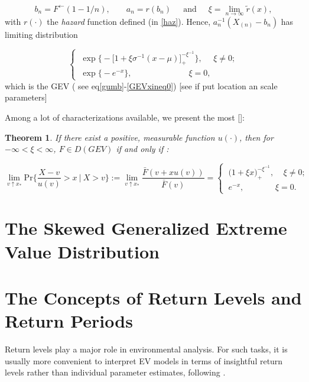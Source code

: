 \documentclass[11pt,a4paper,openany ]{book}
\newtheorem{theorem}{Theorem}[chapter]
\begin{document}
\begin{equation*}
b_n=F^{\leftarrow}(1-1/n)\text{, } \ \ \ \ \ \ \ \ a_n=r(b_n) \ \ \ \ \ \text{ and } \ \ \ \ \ \xi=\displaystyle{\lim_{n \to \infty}}\tilde{r}(x),
\end{equation*}
with $r(\cdot)$ the \emph{hazard} function defined (in \ref{haz}). Hence, $a_n^{-1}(X_{(n)}-b_n)$ has limiting distribution

\begin{equation*}
\begin{cases}
\ \exp\Big\{-\big[1+\xi\sigma^{-1}(x-\mu)\big]_+^{-\xi^{-1}}\Big\}, \ \ \ \ \ \ \xi\neq 0; 
\\
\ \exp\big\{-e^{-x}\big\}, \ \ \ \ \ \ \ \ \ \ \ \ \ \ \ \ \ \ \ \ \ \ \ \ \ \ \ \ \  \  \ \xi=0,
\end{cases}
\end{equation*}
which is the GEV ( see eq\ref{gumb}-\ref{GEVxineq0}) [see if put location an scale parameters]

Among a lot of characterizations available, we present the most []:
\begin{theorem}
	If there exist a positive, measurable function $u(\cdot)$, then for $-\infty<\xi<\infty$, $F\in D(GEV)$ if and only if :
	
	\begin{equation}
	\displaystyle{\lim_{v \uparrow x_*}} \text{Pr} \Bigg\{\frac{X-v}{u(v)}>x \ | \ X>v\Bigg\}:=\displaystyle{\lim_{v \uparrow x_*}}\frac{\bar{F}(v+xu(v))}{\bar{F}(v)}=\begin{cases}
	\ \Big(1+\xi x\Big)_+^{-\xi^{-1}}, \ \ \ \ \ \xi\neq 0;    \\
	\  e^{-x}, \ \ \ \ \ \ \ \ \ \ \ \ \ \ \ \ \ \xi=0.
	\end{cases}
	\end{equation}

\end{theorem}

\section{The Skewed Generalized Extreme Value Distribution}
\cite{ribereau_skew_2016}


\section{The Concepts of Return Levels and Return Periods}\label{rlgev}

Return levels play a major role in environmental analysis. For such tasks, it is usually more convenient to interpret EV models in terms of insightful return levels rather than individual parameter estimates, following \citet[pp.49,pp.81]{coles_introduction_2001}. 
\end{document}
